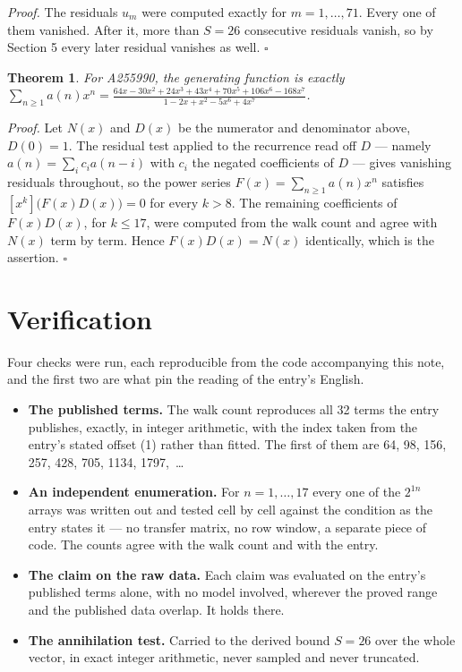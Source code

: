 \documentclass[11pt]{article}
\newtheorem{theorem}{Theorem}
\theoremstyle{definition}
\begin{document}
{\itshape Proof.} The residuals $u_m$ were computed exactly for $m = 1,\dots,71$. Every one of them vanished. After it, more than $S = 26$ consecutive residuals vanish, so by Section 5 every later residual vanishes as well. $\square$

\begin{theorem} For A255990, the generating function is exactly $\sum_{n\ge 1} a(n)x^n = \frac{64x - 30x^{2} + 24x^{3} + 43x^{4} + 70x^{5} + 106x^{6} - 168x^{7}}{1 - 2x + x^{2} - 5x^{6} + 4x^{7}}$.\end{theorem}

{\itshape Proof.} Let $N(x)$ and $D(x)$ be the numerator and denominator above, $D(0)=1$. The residual test applied to the recurrence read off $D$ --- namely $a(n) = \sum_i c_i a(n-i)$ with $c_i$ the negated coefficients of $D$ --- gives vanishing residuals throughout, so the power series $F(x)=\sum_{n\ge 1}a(n)x^n$ satisfies $[x^k]\bigl(F(x)D(x)\bigr) = 0$ for every $k > 8$. The remaining coefficients of $F(x)D(x)$, for $k \le 17$, were computed from the walk count and agree with $N(x)$ term by term. Hence $F(x)D(x) = N(x)$ identically, which is the assertion. $\square$

\section{Verification}

Four checks were run, each reproducible from the code accompanying this note, and the first two are what pin the reading of the entry's English.

\begin{itemize}

\item {\bfseries The published terms.} The walk count reproduces all 32 terms the entry publishes, exactly, in integer arithmetic, with the index taken from the entry's stated offset (1) rather than fitted. The first of them are 64, 98, 156, 257, 428, 705, 1134, 1797,~\dots

\item {\bfseries An independent enumeration.} For $n = 1,\dots,17$ every one of the $2^{1n}$ arrays was written out and tested cell by cell against the condition as the entry states it --- no transfer matrix, no row window, a separate piece of code. The counts agree with the walk count and with the entry.

\item {\bfseries The claim on the raw data.} Each claim was evaluated on the entry's published terms alone, with no model involved, wherever the proved range and the published data overlap. It holds there.

\item {\bfseries The annihilation test.} Carried to the derived bound $S = 26$ over the whole vector, in exact integer arithmetic, never sampled and never truncated.

\end{itemize}
\end{document}
